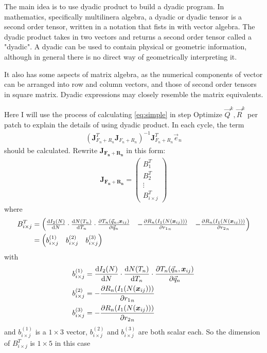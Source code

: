 The main idea is to use dyadic product to build a dyadic program. In mathematics, specifically multilinera algebra, a dyadic or dyadic tensor is a second order tensor, written in a notation that fists in with vector algebra. The dyadic product takes in two vectors and returns a second order tensor called a "dyadic". A dyadic can be used to contain physical or geometric information, although in general there is no direct way of geometrically interpreting it.

It also has some aspects of matrix algebra, as the numerical components of vector can be arranged into row and column vectors, and those of second order tensors in square matrix. Dyadic expressions may closely resemble the matrix equivalents.

Here I will use the process of calculating \cref{eq:simple} in step Optimize $\vec{Q}^k, \vec{R}^k$ per patch to explain the details of using dyadic product. In each cycle, the term
\begin{align}
	\left(\mathbf{J}_{F_n+R_n}^{T} \mathbf{J}_{F_n+R_n} \right)^{-1} \mathbf{J}_{F_n+R_n}^{T} \vec{e}_{n} \nonumber
\end{align} 
should be calculated. Rewrite $\mathbf{J_{F_n+R_n}}$ in this form:
\begin{align}
	\mathbf{J_{F_n+R_n}} = \begin{pmatrix}
		B_1^T\\
		B_2^T\\
		\vdots\\
		B_{i\times j}^T
		\end{pmatrix}
\end{align}
where 
\begin{align}
	B_{i \times j}^T &= \begin{pmatrix}\frac{\mathrm{d} I_2(N)}{\mathrm{d}N}\cdot \frac{\mathrm{d} N(T_n)}{\mathrm{d} T_n}\cdot \frac{\partial T_n(\vec{q}_n, \boldsymbol{x}_{ij})}{\partial \vec{q}_n}&- \frac{\partial R_n(I_1(N(\boldsymbol{x}_{ij})))}{\partial {r_1}_n} & - \frac{\partial R_n(I_1(N(\boldsymbol{x}_{ij})))}{\partial {r_2}_n} \end{pmatrix}\\
	&= \begin{pmatrix} b_{i \times j}^{(1)} & b_{i \times j}^{(2)} & b_{i \times j}^{(3)}\end{pmatrix}
\end{align}
with 
\begin{align}
b_{i \times j}^{(1)} &= \frac{\mathrm{d} I_2(N)}{\mathrm{d}N}\cdot \frac{\mathrm{d} N(T_n)}{\mathrm{d} T_n}\cdot \frac{\partial T_n(\vec{q}_n, \boldsymbol{x}_{ij})}{\partial \vec{q}_n} \nonumber \\
b_{i \times j}^{(2)} & = - \frac{\partial R_n(I_1(N(\boldsymbol{x}_{ij})))}{\partial {r_1}_n} \nonumber \\
b_{i \times j}^{(3)}&= - \frac{\partial R_n(I_1(N(\boldsymbol{x}_{ij})))}{\partial {r_2}_n} \nonumber 
\end{align}
and $b_{i \times j}^{(1)}$ is a $1 \times 3$ vector, $b_{i \times j}^{(2)}$ and $b_{i \times j}^{(3)}$ are both scalar each. So the dimension of $B_{i \times j}^T $ is $1 \times 5 $ in this case

